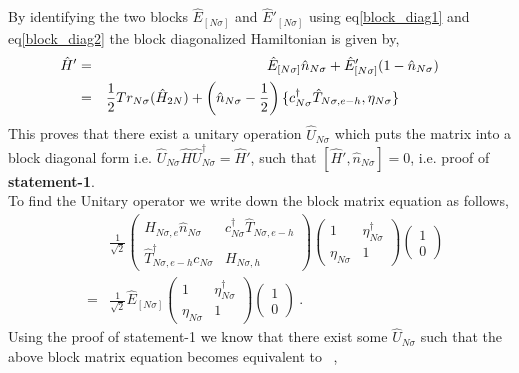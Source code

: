 \documentclass[12pt,a4paper]{article}
\begin{document}
By identifying the two blocks $\hat{E}_{[N\sigma]}$ and $\hat{E}'_{[N\sigma]}$ using eq\eqref{block_diag1} and eq\eqref{block_diag2}  the block diagonalized Hamiltonian is given by,
\begin{eqnarray}
\hspace*{-0.5cm}
\hat{H}' &=& \hat{E}_{[N\sigma]}\hat{n}_{N\sigma}+\hat{E}'_{[N\sigma]}(1-\hat{n}_{N\sigma})\nonumber\\
\hspace*{-1.2cm}				&=&\frac{1}{2}Tr_{N\sigma}(\hat{H}_{2N})+\left(\hat{n}_{N\sigma}-\frac{1}{2}\right)\lbrace c^{\dagger}_{N\sigma}\hat{T}_{N\sigma,e-h},\eta_{N\sigma}\rbrace\hspace*{1cm}\label{block_diag_ham}
\end{eqnarray}
This proves that there exist a unitary operation $\hat{U}_{N\sigma}$ which puts the matrix into a block diagonal form i.e. $\hat{U}_{N\sigma}\hat{H}\hat{U}^{\dagger}_{N\sigma}=\hat{H}'$, such that $[\hat{H}',\hat{n}_{N\sigma}]=0$, i.e. proof of \textbf{statement-1}.\\
To find the Unitary operator we write down the block matrix equation  as follows,
\begin{eqnarray}
&&\frac{1}{\sqrt{2}}
\begin{pmatrix}
			H_{N\sigma,e}\hat{n}_{N\sigma}								 & c^{\dagger}_{N\sigma}\hat{T}_{N\sigma,e-h}\\
				\hat{T}^{\dagger}_{N\sigma,e-h}c_{N\sigma}						& H_{N\sigma,h}
											\end{pmatrix}\begin{pmatrix}
											1 & \eta^{\dagger}_{N\sigma}\\
											\eta_{N\sigma} & 1
											\end{pmatrix}\begin{pmatrix}
											1 \\ 0
											\end{pmatrix}\nonumber\\
											&=&\frac{1}{\sqrt{2}}\hat{E}_{[N\sigma]}\begin{pmatrix}
											1 & \eta^{\dagger}_{N\sigma}\\
											\eta_{N\sigma} & 1
											\end{pmatrix}\begin{pmatrix}
											1 \\ 0
											\end{pmatrix}~.
\end{eqnarray}
Using the proof of statement-1 we know that there exist some $\hat{U}_{N\sigma}$ such that the above block matrix equation becomes equivalent to ~,~
\end{document}

